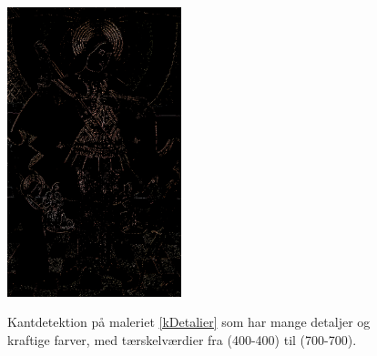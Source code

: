 \begin{figure}[!h]
{        \includegraphics[angle=0,width=0.45\textwidth]{afsnit/afprovning/billeder/thressholds/krafitige_farver/krafite_detalier/1_iteration/600-600.png}
        \label{600-600}}
    \caption{Kantdetektion på maleriet \ref{kDetalier} som har mange
	detaljer og kraftige farver, med tærskelværdier fra (400-400) til
	(700-700).}
     \label{allesammen2}
\end{figure}

